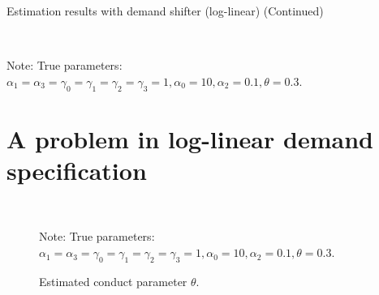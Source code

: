 \documentclass[11pt, a4paper]{article}
\begin{document}
\begin{table}[!htbp]
  \ContinuedFloat  %
  \begin{center}
      \caption{Estimation results with demand shifter (log-linear) (Continued)}
      \label{tb:loglinear_loglinear_sigma_1} 
      \subfloat[$\sigma=1.0$]{}\\
    \subfloat[$\sigma=2.0$]{}
  \end{center}\footnotesize
  Note: True parameters: $\alpha_1 = \alpha_3 = \gamma_0 = \gamma_1 = \gamma_2  = \gamma_3 = 1, \alpha_0 = 10, \alpha_2 = 0.1,  \theta = 0.3.$
\end{table} 


\section{A problem in log-linear demand specification}



\begin{figure}[!htbp]
  \begin{center}
  \\
  \caption{Estimated conduct parameter $\theta$.}
  \label{fg:histogram_loglinear_loglinear_n_1000_sigma_2} 
  \end{center}
  \footnotesize
  Note: True parameters: $\alpha_1 = \alpha_3 = \gamma_0 = \gamma_1 = \gamma_2  = \gamma_3 = 1, \alpha_0 = 10, \alpha_2 = 0.1,  \theta = 0.3.$
\end{figure} 
\end{document}
